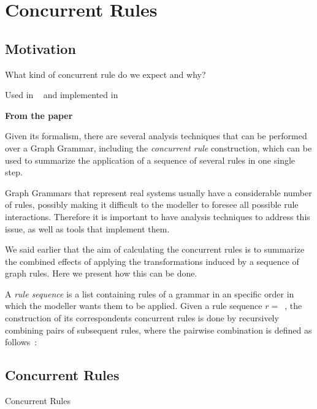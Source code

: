 \chapter{Concurrent Rules}

\section{Motivation}

What kind of concurrent rule do we expect and why?

Used in ~\cite{BezerraWEIT2016} and implemented in ~\cite{BezerraETMF2016}

\textbf{From the paper}

Given its formalism, there are several analysis techniques that can be performed over a Graph Grammar, including the \emph{concurrent rule} construction, which can be used to summarize the application of a sequence of several rules in one single step.

Graph Grammars that represent real systems usually have a considerable number of rules, possibly making it difficult to the modeller to foresee all possible rule interactions. Therefore it is important to have analysis techniques to address this issue, as well as tools that implement them.

We said earlier that the aim of calculating the concurrent rules is to summarize the combined effects of applying the transformations induced by a sequence of graph rules. Here we present how this can be done.

A \emph{rule sequence} is a list containing rules of a grammar in an specific order in which the modeller wants them to be applied. Given a rule sequence \mbox{$r =$ }, the construction of its correspondents concurrent rules is done by recursively combining pairs of subsequent rules, where the pairwise combination is defined as follows~\cite{Ehrig2006,Lambers2010}:  

\section{Concurrent Rules}

\begin{definition}{Concurrent Rules}

\end{definition}

